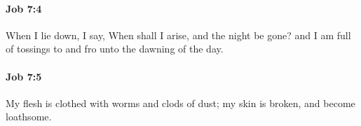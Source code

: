 		\paragraph{Job 7:4} %
			\label{JOB-7-4}

			When I lie down, I say, When shall I arise, and the night be gone? and I am full of tossings to and fro unto the dawning of the day.


		\paragraph{Job 7:5} %
			\label{JOB-7-5}

			My flesh is clothed with worms and clods of dust; my skin is broken, and become loathsome.



